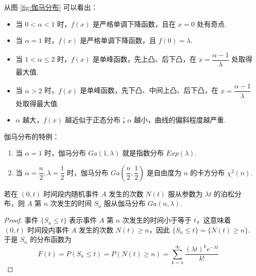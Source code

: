 从图 \ref{fig:伽马分布} 可以看出：
\begin{itemize}
    \item 当 $0 < \alpha < 1$ 时，$f(x)$ 是严格单调下降函数，且在 $x=0$ 处有奇点.
    \item 当 $\alpha = 1$ 时，$f(x)$ 是严格单调下降函数，且 $f(0) = \lambda$.
    \item 当 $1 < \alpha \leqslant 2$ 时，$f(x)$ 是单峰函数，先上凸、后下凸，在 $x = \dfrac{\alpha - 1}{\lambda}$ 处取得最大值.
    \item 当 $\alpha > 2$ 时，$f(x)$ 是单峰函数，先下凸、中间上凸、后下凸，在 $x = \dfrac{\alpha - 1}{\lambda}$ 处取得最大值.
    \item $\alpha$ 越大，$f(x)$ 越近似于正态分布；$\alpha$ 越小，曲线的偏斜程度越严重.
\end{itemize}

伽马分布的特例：
\begin{enumerate}
    \item 当 $\alpha = 1$ 时，伽马分布 $Ga(1, \lambda)$ 就是指数分布 $Exp(\lambda)$.
    \item 当 $\alpha = \dfrac{n}{2}, \lambda = \dfrac{1}{2}$ 时，伽马分布 $Ga(\dfrac{n}{2}, \dfrac{1}{2})$ 是自由度为 $n$ 的卡方分布 $\chi^2(n)$.
\end{enumerate}

\begin{conclusion}[][泊松分布与伽马分布的关系]
    \indent 若在 $(0,t)$ 时间段内随机事件 $A$ 发生的次数 $N(t)$ 服从参数为 $\lambda t$ 的泊松分布，则 $A$ 第 $n$ 次发生的时间 $S_n$ 服从伽马分布 $Ga(n, \lambda)$.
\end{conclusion}

\begin{proof}
    事件 $\{ S_n \leqslant t \}$ 表示事件 $A$ 第 $n$ 次发生的时间小于等于 $t$，这意味着 $(0,t)$ 时间段内事件 $A$ 发生的次数 $N(t) \geqslant n$，因此 $\{ S_n \leqslant t \} = \{ N(t) \geqslant n \}$.于是 $S_n$ 的分布函数为
    $$
    F(t) = P(S_n \leqslant t) = P(N(t) \geqslant n) = \sum_{k=n}^{\infty} \dfrac{(\lambda t)^k e^{-\lambda t}}{k!}
    $$
\end{proof}



